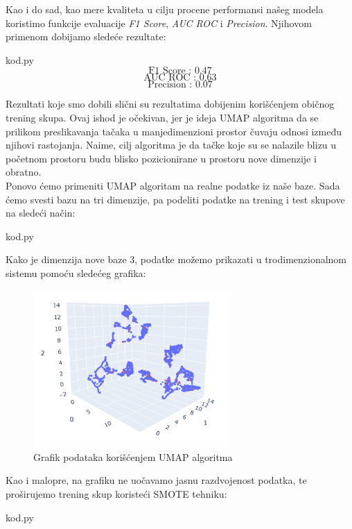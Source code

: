 \documentclass[12pt]{article}
\theoremstyle{definition}
\theoremstyle{remark}
\begin{document}
Kao i do sad, kao mere kvaliteta u cilju procene performansi našeg modela koristimo funkcije evaluacije  \emph{F1 Score}, \emph{AUC ROC} i \emph{Precision}. Njihovom primenom dobijamo sledeće rezultate:

\hfill

{kod.py}
$$
\text{F1 Score : 0.47}
$$
$$
\text{AUC ROC : 0.63}
$$
$$
\text{Precision : 0.07}
$$

\hfill

Rezultati koje smo dobili slični su rezultatima dobijenim korišćenjem običnog trening skupa. Ovaj ishod je očekivan, jer je ideja UMAP algoritma da se prilikom preslikavanja tačaka u manjedimenzioni prostor čuvaju odnosi između njihovi rastojanja. Naime, cilj algoritma je da tačke koje su se nalazile blizu u početnom prostoru budu blisko pozicionirane u prostoru nove dimenzije i obratno. \\

Ponovo ćemo primeniti UMAP algoritam na realne podatke iz naše baze. Sada ćemo svesti bazu na tri dimenzije, pa podeliti podatke na trening i test skupove na sledeći način:


\hfill

{kod.py}

\hfill

Kako je dimenzija nove baze $3$, podatke možemo prikazati u trodimenzionalnom sistemu pomoću sledećeg grafika:

\begin{figure}[htp]
    \centering
    \includegraphics[width=7.5cm]{prvi3dgrafik.png}
    \caption{Grafik podataka korišćenjem UMAP algoritma}
    \label{fig:galaxy}
\end{figure}

Kao i malopre, na grafiku ne uočavamo jasnu razdvojenost podatka, te proširujemo trening skup koristeći SMOTE tehniku:


\hfill

{kod.py}
\end{document}

